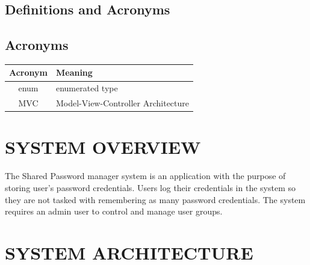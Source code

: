 \documentclass[letterpaper,12pt,oneside,listof=totoc]{scrreprt}
\begin{document}
\section{Definitions and Acronyms}

\section{Acronyms}
\begin{tabular}{| c | p{}|}
\hline
Acronym & Meaning\\
\hline
enum & enumerated type \\
\hline
MVC & Model-View-Controller Architecture \\
\hline
\end{tabular}
 \newline
 
\chapter{SYSTEM OVERVIEW}
The Shared Password manager system is an application with the purpose of storing user's password credentials. Users log their credentials in the system so they are not tasked with remembering as many password credentials. The system requires an admin user to control and manage user groups. 

\chapter{SYSTEM ARCHITECTURE}
\end{document}
